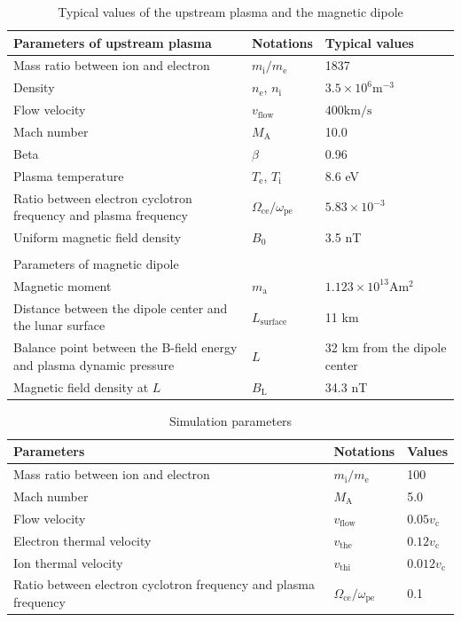 \documentclass[draft,jgrga]{agutex2015}
\begin{document}
\begin{article}
\begin{table}[h]
\caption{Typical values of the upstream plasma and the magnetic dipole}
\centering
 \begin{tabular}{p{}ll}
 Parameters of upstream plasma    &  Notations    &  Typical values \\  \hline           
 Mass ratio between ion and electron & $m_\mathrm{i}/m_\mathrm{e}$ & 1837 \\
 Density       & $n_\mathrm{e}$, $n_\mathrm{i}$  &  $3.5 \times 10^6 \mathrm{m^{-3}}$   \\ 
 Flow velocity & $v_\mathrm{flow}$               &  $400  \mathrm{km/s}  $              \\
 Mach number   & $M_\mathrm{A}$                  & 10.0 \\
 Beta          &  $\beta$                        & 0.96 \\
 Plasma temperature & $T_\mathrm{e}$, $T_\mathrm{i}$    &  $8.6$ eV \\
 Ratio between electron cyclotron frequency and plasma frequency & 
  $\Omega_\mathrm{ce}/\omega_\mathrm{pe}$ & $5.83 \times 10^{-3}$ \\ 
 Uniform magnetic field density &  $B_\mathrm{0}$   &   3.5 nT          \\ \hline 
                &                                &     \\
 Parameters of magnetic dipole               &                &         \\ \hline
 Magnetic moment &  $ m_\mathrm{a}$   &  $ 1.123 \times 10^{13} \mathrm{Am^2}$ \\
 Distance between the dipole center and the lunar surface & $L_\mathrm{surface}$ & 11 km \\
 Balance point between the B-field energy and plasma dynamic pressure 
 & $L$ &  32 km  from the dipole center  \\
 Magnetic field density at $L$  & $B_\mathrm{L}$ & 34.3 nT  \\  \hline
 \end{tabular}
\end{table}


\begin{table}[h]
\caption{
Simulation parameters
}
\centering
 \begin{tabular}{p{}ll}
 Parameters    &  Notations    &  Values \\  \hline           
 Mass ratio between ion and electron & $m_\mathrm{i}/m_\mathrm{e}$    & 100 \\
 Mach number                         & $M_\mathrm{A}$ & 5.0 \\
 Flow velocity                       & $v_\mathrm{flow} $  &  $0.05v_\mathrm{c}$ \\
 Electron thermal velocity           & $v_\mathrm{the}$ &  $0.12v_\mathrm{c}$ \\
 Ion thermal velocity                & $v_\mathrm{thi}$ &  $ 0.012v_\mathrm{c}$ \\
 Ratio between electron cyclotron frequency and plasma frequency & 
  $\Omega_\mathrm{ce}/\omega_\mathrm{pe}$ & 0.1 \\  \hline


\end{tabular}
\end{table}
\end{article}
\end{document}
